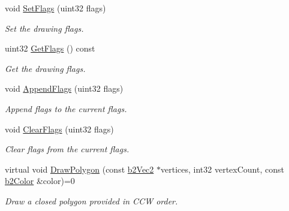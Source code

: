 \begin{DoxyCompactItemize}
\mbox{\label{classb2Draw_ac2bbe31595478690e44de4ff1e7f347e}} 
void \hyperlink{classb2Draw_ac2bbe31595478690e44de4ff1e7f347e}{Set\+Flags} (uint32 flags)
\begin{DoxyCompactList}\small\item\em Set the drawing flags. \end{DoxyCompactList}\item 
\mbox{\label{classb2Draw_a10926d67ad6d3a2517197c4f10923700}} 
uint32 \hyperlink{classb2Draw_a10926d67ad6d3a2517197c4f10923700}{Get\+Flags} () const
\begin{DoxyCompactList}\small\item\em Get the drawing flags. \end{DoxyCompactList}\item 
\mbox{\label{classb2Draw_acc2fd4648ee0a65574770c64528f7166}} 
void \hyperlink{classb2Draw_acc2fd4648ee0a65574770c64528f7166}{Append\+Flags} (uint32 flags)
\begin{DoxyCompactList}\small\item\em Append flags to the current flags. \end{DoxyCompactList}\item 
\mbox{\label{classb2Draw_afc240b71f4ba8c17440d6ed526d4e22e}} 
void \hyperlink{classb2Draw_afc240b71f4ba8c17440d6ed526d4e22e}{Clear\+Flags} (uint32 flags)
\begin{DoxyCompactList}\small\item\em Clear flags from the current flags. \end{DoxyCompactList}\item 
\mbox{\label{classb2Draw_acd5427d1d2e7d19f1b34ad3620134d28}} 
virtual void \hyperlink{classb2Draw_acd5427d1d2e7d19f1b34ad3620134d28}{Draw\+Polygon} (const \hyperlink{structb2Vec2}{b2\+Vec2} $\ast$vertices, int32 vertex\+Count, const \hyperlink{structb2Color}{b2\+Color} \&color)=0
\begin{DoxyCompactList}\small\item\em Draw a closed polygon provided in C\+CW order. \end{DoxyCompactList}\item 
\mbox{\label{classb2Draw_a76f2d67de0781a32cab116278c5c9eea}} 

\end{DoxyCompactItemize}
